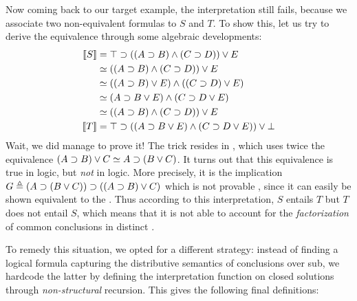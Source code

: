 Now coming back to our target example,
the interpretation still fails, because we associate two non-equivalent
formulas to $S$ and $T$. To show this, let us try to derive the equivalence
through some algebraic developments:
\begin{align}
  \sint{S} &= \top \limp ((A \limp B) \land (C \limp D)) \lor E \nonumber\\
              &\semequiv ((A \limp B) \land (C \limp D)) \lor E \nonumber\\
              &\semequiv ((A \limp B) \lor E) \land ((C \limp D) \lor E) \nonumber\\
              &\semequiv (A \limp B \lor E) \land (C \limp D \lor E) \labeq{grishin}\\
              &\semequiv ((A \limp B) \land (C \limp D)) \lor E \nonumber\\
  \sint{T} &= \top \limp ((A \limp B \lor E) \land (C \limp D \lor E)) \lor \bot \nonumber
\end{align}
Wait, we did manage to prove it! The trick resides in , which
uses twice the equivalence $(A \supset B) \lor C \simeq A \supset (B \lor C)$. It
turns out that this equivalence is true in  logic, but \emph{not} in
 logic. More precisely, it is the implication $G \triangleq (A \supset
(B \lor C)) \supset ((A \supset B) \lor C)$ which is not provable
, since it can easily be shown equivalent to the . Thus according to this interpretation, $S$
entails $T$ but $T$ does not entail $S$, which means that it is not able to
account for the \emph{factorization} of common conclusions in distinct .

To remedy this situation, we opted for a different strategy: instead of finding
a logical formula capturing the distributive semantics of conclusions over
sub, we hardcode the latter by defining the interpretation function on
closed solutions through \emph{non-structural} recursion. This gives the
following final definitions:

